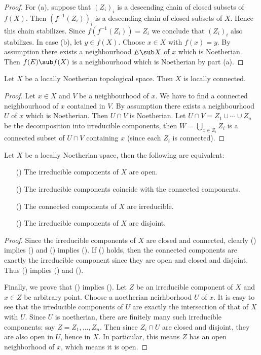 \begin{proof}
For (a), suppose that $(Z_i)_i$ is a descending chain of closed subsets of $f(X)$. Then $(f^{-1}(Z_i))_i$ is a descending chain of closed subsets of $X$. Hence this chain stabilizes. Since $f(f^{-1}(Z_i))=Z_i$ we conclude that $(Z_i)_i$ also stabilizes. In case (b), let $y\in f(X)$. Choose $x\in X$ with $f(x)=y$. By assumption there exists a neighbourhood $E\sub X$ of $x$ which is Noetherian. Then $f(E)\sub f(X)$ is a neighbourhood which is Noetherian by part (a).
\end{proof}
\begin{proposition}\label{topo space local Noe is local connected}
Let $X$ be a locally Noetherian topological space. Then $X$ is locally
connected.
\end{proposition}
\begin{proof}
Let $x\in X$ and $V$ be a neighbourhood of $x$. We have to find a connected neighbourhood of $x$ contained in $V$. By assumption there exists a neighbourhood $U$ of $x$ which is Noetherian. Then $U\cap V$ is Noetherian. Let $U\cap V=Z_1\cup\cdots\cup Z_n$ be the decomposition into irreducible components, then $W=\bigcup_{x\in Z_i}Z_i$ is a connected subset of $U\cap V$ containing $x$ (since each $Z_i$ is connected).
\end{proof}
\begin{proposition}\label{topo space locally Noe irre component open iff}
Let $X$ be a locally Noetherian space, then the following are equivalent:
\begin{itemize}
\item[(\rmnum{1})] The irreducible components of $X$ are open.
\item[(\rmnum{2})] The irreducible components coincide with the connected components.
\item[(\rmnum{3})] The connected components of $X$ are irreducible.
\item[(\rmnum{4})] The irreducible components of $X$ are disjoint.
\end{itemize}
\end{proposition}
\begin{proof}
Since the irreducible components of $X$ are closed and connected, clearly () implies () and () implies (). If () holds, then the connected components are exactly the irreducible component since they are open and closed and disjoint. Thus () implies () and ().\par
Finally, we prove that () implies (). Let $Z$ be an irreducible component of $X$ and $x\in Z$ be arbitrary point. Choose a noetherian neirhborhood $U$ of $x$. It is easy to see that the irreducible components of $U$ are exactly the intersection of that of $X$ with $U$. Since $U$ is noetherian, there are finitely many such irreducible components: say $Z=Z_1,\dots,Z_n$. Then since $Z_i\cap U$ are closed and disjoint, they are also open in $U$, hence in $X$. In particular, this means $Z$ has an open neighborhood of $x$, which means it is open.
\end{proof}
